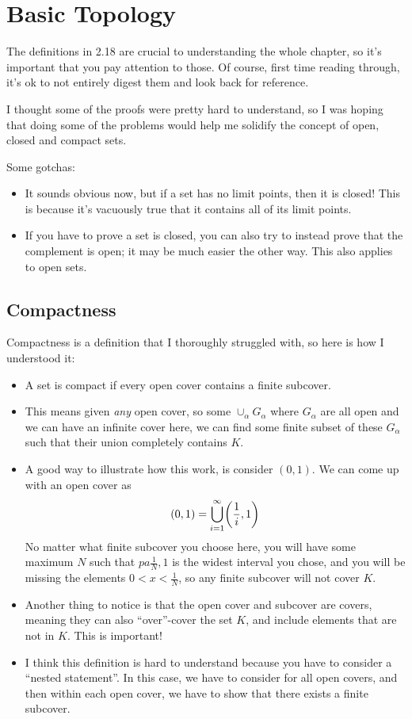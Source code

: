 \chapter{Basic Topology}

The definitions in 2.18 are crucial to understanding the whole chapter, so it's important that you pay attention to those. Of course, first time reading through, it's ok to not entirely digest them and look back for reference.

I thought some of the proofs were pretty hard to understand, so I was hoping that doing some of the problems would help me solidify the concept of open, closed and compact sets.

Some gotchas:
\begin{itemize}
  \item It sounds obvious now, but if a set has no limit points, then it is closed! This is because it's vacuously true that it contains all of its limit points.
  \item If you have to prove a set is closed, you can also try to instead prove that the complement is open; it may be much easier the other way. This also applies to open sets.
\end{itemize}

\section{Compactness}
\label{chap2:compactness}
Compactness is a definition that I thoroughly struggled with, so here is how I understood it:
\begin{itemize}
  \item A set is compact if every open cover contains a finite subcover.
  \item This means given \textit{any} open cover, so some $\cup_\alpha G_\alpha$ where $G_\alpha$ are all open and we can have an infinite cover here, we can find some finite subset of these $G_\alpha$ such that their union completely contains $K$.
  \item A good way to illustrate how this work, is consider $(0, 1)$. We can come up with an open cover as
        \begin{equation}
          (0, 1) = \bigcup_{i = 1}^\infty \pa{\frac{1}{i}, 1}
        \end{equation}
        No matter what finite subcover you choose here, you will have some maximum $N$ such that $pa{\frac{1}{N}, 1}$ is the widest interval you chose, and you will be missing the elements $0 < x < \frac{1}{N}$, so any finite subcover will not cover $K$.
  \item Another thing to notice is that the open cover and subcover are covers, meaning they can also ``over''-cover the set $K$, and include elements that are not in $K$. This is important!
  \item I think this definition is hard to understand because you have to consider a ``nested statement''. In this case, we have to consider for all open covers, and then within each open cover, we have to show that there exists a finite subcover.
\end{itemize}


